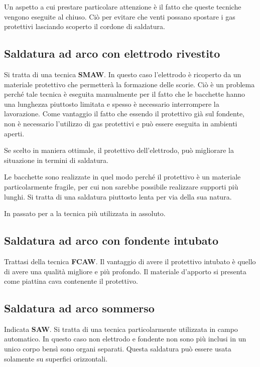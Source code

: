 Un aspetto a cui prestare particolare attenzione è il fatto che queste tecniche vengono eseguite al chiuso. Ciò per evitare che venti possano spostare i gas protettivi lasciando scoperto il cordone di saldatura.

\subsection{Saldatura ad arco con elettrodo rivestito}
Si tratta di una tecnica \textbf{SMAW}. In questo caso l'elettrodo è ricoperto da un materiale protettivo che permetterà la formazione delle scorie.
Ciò è un problema perché tale tecnica è eseguita manualmente per il fatto che le bacchette hanno una lunghezza piuttosto limitata e spesso è necessario interrompere la lavorazione.
Come vantaggio il fatto che essendo il protettivo già sul fondente, non è necessario l'utilizzo di gas protettivi e può essere eseguita in ambienti aperti.

Se scelto in maniera ottimale, il protettivo dell'elettrodo, può migliorare la situazione in termini di saldatura.

Le bacchette sono realizzate in quel modo perché il protettivo è un materiale particolarmente fragile, per cui non sarebbe possibile realizzare supporti più lunghi.
Si tratta di una saldatura piuttosto lenta per via della sua natura.

In passato per a la tecnica più utilizzata in assoluto.

\subsection{Saldatura ad arco con fondente intubato}
Trattasi della tecnica \textbf{FCAW}.
Il vantaggio di avere il protettivo intubato è quello di avere una qualità migliore e più profondo. Il materiale d'apporto si presenta come piattina cava contenente il protettivo.


\subsection{Saldatura ad arco sommerso}
Indicata \textbf{SAW}.
Si tratta di una tecnica particolarmente utilizzata in campo automatico.
In questo caso non elettrodo e fondente non sono più inclusi in un unico corpo bensì sono organi separati.
Questa saldatura può essere usata solamente su superfici orizzontali.


